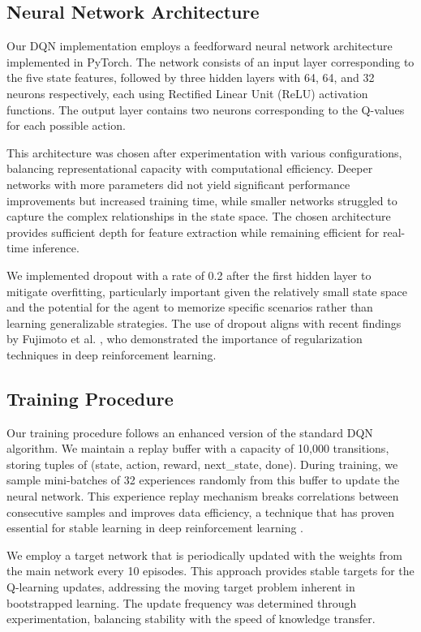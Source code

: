 \subsection{Neural Network Architecture}

Our DQN implementation employs a feedforward neural network architecture implemented in PyTorch. The network consists of an input layer corresponding to the five state features, followed by three hidden layers with 64, 64, and 32 neurons respectively, each using Rectified Linear Unit (ReLU) activation functions. The output layer contains two neurons corresponding to the Q-values for each possible action.

This architecture was chosen after experimentation with various configurations, balancing representational capacity with computational efficiency. Deeper networks with more parameters did not yield significant performance improvements but increased training time, while smaller networks struggled to capture the complex relationships in the state space. The chosen architecture provides sufficient depth for feature extraction while remaining efficient for real-time inference.

We implemented dropout with a rate of 0.2 after the first hidden layer to mitigate overfitting, particularly important given the relatively small state space and the potential for the agent to memorize specific scenarios rather than learning generalizable strategies. The use of dropout aligns with recent findings by Fujimoto et al. \cite{fujimoto2021minimalist}, who demonstrated the importance of regularization techniques in deep reinforcement learning.

\subsection{Training Procedure}

Our training procedure follows an enhanced version of the standard DQN algorithm. We maintain a replay buffer with a capacity of 10,000 transitions, storing tuples of (state, action, reward, next\_state, done). During training, we sample mini-batches of 32 experiences randomly from this buffer to update the neural network. This experience replay mechanism breaks correlations between consecutive samples and improves data efficiency, a technique that has proven essential for stable learning in deep reinforcement learning \cite{wang2022offline}.

We employ a target network that is periodically updated with the weights from the main network every 10 episodes. This approach provides stable targets for the Q-learning updates, addressing the moving target problem inherent in bootstrapped learning. The update frequency was determined through experimentation, balancing stability with the speed of knowledge transfer.

